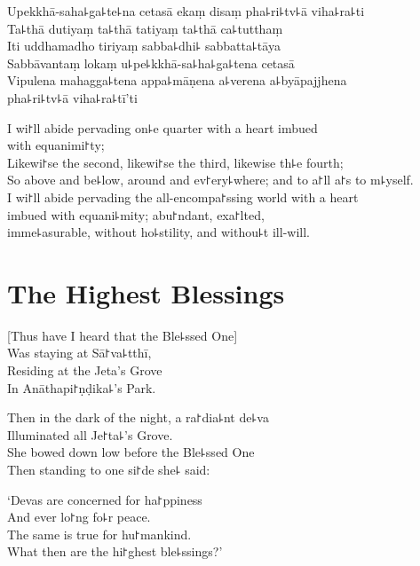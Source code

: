 \clearpage

Upekkhā-saha꜕ga꜕te꜕na cetasā ekaṃ disaṃ pha꜕ri꜕tv꜕ā viha꜕ra꜕ti\\%
Ta꜕thā dutiyaṃ ta꜕thā tatiyaṃ ta꜕thā ca꜕tutthaṃ\\
Iti uddhamadho tiriyaṃ sabba꜕dhi꜕ sabbatta꜕tāya\\
Sabbāvantaṃ lokaṃ u꜕pe꜕kkhā-sa꜕ha꜕ga꜕tena cetasā\\
Vipulena mahagga꜕tena appa꜕māṇena a꜕verena a꜕byāpajjhena\\
\vin pha꜕ri꜕tv꜕ā viha꜕ra꜕tī'ti

\clearpage

I wi꜓ll abide pervading on꜕e quarter with a heart imbued\\%
\vin with equanimi꜓ty;\\
Likewi꜓se the second, likewi꜓se the third, likewise th꜕e fourth;\\
So above and be꜕low, around and ev꜓ery꜕where; and to a꜓ll a꜓s to m꜕yself.\\
I wi꜓ll abide pervading the all-encompa꜓ssing world with a heart \\
\vin imbued with equani꜕mity; abu꜓ndant, exa꜓lted,\\
\vin imme꜕asurable, without ho꜕stility, and withou꜕t ill-will.

\chapter{The Highest Blessings}%


\begin{leader}
\end{leader}

[Thus have I heard that the Ble꜕ssed One]\\
Was staying at Sā꜓va꜕tthī,\\
Residing at the Jeta's Grove\\
In Anāthapi꜓ṇḍika꜕'s Park.

Then in the dark of the night, a ra꜓dia꜕nt de꜕va\\
Illuminated all Je꜓ta꜕'s Grove.\\
She bowed down low before the Ble꜕ssed One\\
Then standing to one si꜓de she꜕ said:

`Devas are concerned for ha꜓ppiness\\
And ever lo꜓ng fo꜕r peace.\\
The same is true for hu꜓mankind.\\
What then are the hi꜓ghest ble꜕ssings?'

